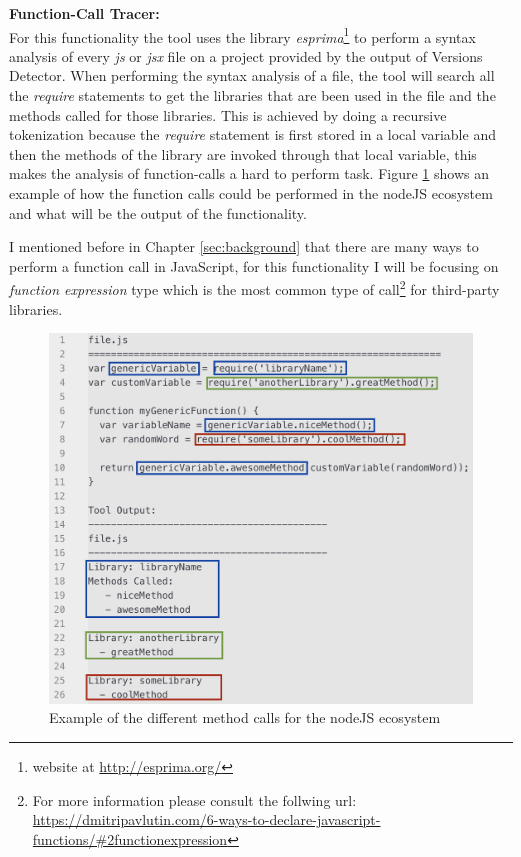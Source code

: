 \textbf{Function-Call Tracer:}\\
For this functionality the tool uses the library \textit{esprima}\footnote{website at \url{http://esprima.org/}} to perform a syntax analysis of every \textit{js} or \textit{jsx} file on a project provided by the output of Versions Detector. 
When performing the syntax analysis of a file, the tool will search all the \textit{require} statements to get the libraries that are been used in the file and the methods called for those libraries. This is achieved by doing a recursive tokenization because the \textit{require} statement is first stored in a local variable and then the methods of the library are invoked through that local variable, this makes the analysis of function-calls a hard to perform task. Figure \ref{fig:libExamples} shows an example of how the function calls could be performed in the nodeJS ecosystem and what will be the output of the functionality. 

I mentioned before in Chapter \ref{sec:background} that there are many ways to perform a function call in JavaScript, for this functionality I will be focusing on \textit{function expression} type which is the most common type of call\footnote{For more information please consult the follwing url: \url{https://dmitripavlutin.com/6-ways-to-declare-javascript-functions/\#2functionexpression}} for third-party libraries. 

\begin{figure}[ht!]
\centering
\includegraphics[width=1\textwidth]{images/libraries_example.png}
\caption{Example of the different method calls for the nodeJS ecosystem}
\label{fig:libExamples}
\end{figure}

